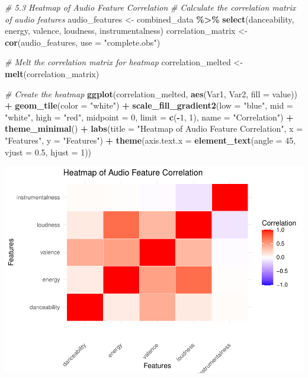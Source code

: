 \documentclass[
]{article}
\newenvironment{Shaded}{\begin{snugshade}}{\end{snugshade}}
\newcommand{\AttributeTok}[1]{\textcolor[rgb]{0.13,0.29,0.53}{#1}}
\newcommand{\CommentTok}[1]{\textcolor[rgb]{0.56,0.35,0.01}{\textit{#1}}}
\newcommand{\DecValTok}[1]{\textcolor[rgb]{0.00,0.00,0.81}{#1}}
\newcommand{\FloatTok}[1]{\textcolor[rgb]{0.00,0.00,0.81}{#1}}
\newcommand{\FunctionTok}[1]{\textcolor[rgb]{0.13,0.29,0.53}{\textbf{#1}}}
\newcommand{\NormalTok}[1]{#1}
\newcommand{\OtherTok}[1]{\textcolor[rgb]{0.56,0.35,0.01}{#1}}
\newcommand{\SpecialCharTok}[1]{\textcolor[rgb]{0.81,0.36,0.00}{\textbf{#1}}}
\newcommand{\StringTok}[1]{\textcolor[rgb]{0.31,0.60,0.02}{#1}}
\begin{document}
\begin{Shaded}
\begin{Highlighting}[]
\CommentTok{\# 5.3 Heatmap of Audio Feature Correlation}
\CommentTok{\# Calculate the correlation matrix of audio features}
\NormalTok{audio\_features }\OtherTok{\textless{}{-}}\NormalTok{ combined\_data }\SpecialCharTok{\%\textgreater{}\%} \FunctionTok{select}\NormalTok{(danceability, energy, valence, loudness, instrumentalness)}
\NormalTok{correlation\_matrix }\OtherTok{\textless{}{-}} \FunctionTok{cor}\NormalTok{(audio\_features, }\AttributeTok{use =} \StringTok{"complete.obs"}\NormalTok{)}

\CommentTok{\# Melt the correlation matrix for heatmap}
\NormalTok{correlation\_melted }\OtherTok{\textless{}{-}} \FunctionTok{melt}\NormalTok{(correlation\_matrix)}

\CommentTok{\# Create the heatmap}
\FunctionTok{ggplot}\NormalTok{(correlation\_melted, }\FunctionTok{aes}\NormalTok{(Var1, Var2, }\AttributeTok{fill =}\NormalTok{ value)) }\SpecialCharTok{+}
  \FunctionTok{geom\_tile}\NormalTok{(}\AttributeTok{color =} \StringTok{"white"}\NormalTok{) }\SpecialCharTok{+}
  \FunctionTok{scale\_fill\_gradient2}\NormalTok{(}\AttributeTok{low =} \StringTok{"blue"}\NormalTok{, }\AttributeTok{mid =} \StringTok{"white"}\NormalTok{, }\AttributeTok{high =} \StringTok{"red"}\NormalTok{, }\AttributeTok{midpoint =} \DecValTok{0}\NormalTok{, }\AttributeTok{limit =} \FunctionTok{c}\NormalTok{(}\SpecialCharTok{{-}}\DecValTok{1}\NormalTok{, }\DecValTok{1}\NormalTok{), }\AttributeTok{name =} \StringTok{"Correlation"}\NormalTok{) }\SpecialCharTok{+}
  \FunctionTok{theme\_minimal}\NormalTok{() }\SpecialCharTok{+}
  \FunctionTok{labs}\NormalTok{(}\AttributeTok{title =} \StringTok{"Heatmap of Audio Feature Correlation"}\NormalTok{, }\AttributeTok{x =} \StringTok{"Features"}\NormalTok{, }\AttributeTok{y =} \StringTok{"Features"}\NormalTok{) }\SpecialCharTok{+}
  \FunctionTok{theme}\NormalTok{(}\AttributeTok{axis.text.x =} \FunctionTok{element\_text}\NormalTok{(}\AttributeTok{angle =} \DecValTok{45}\NormalTok{, }\AttributeTok{vjust =} \FloatTok{0.5}\NormalTok{, }\AttributeTok{hjust =} \DecValTok{1}\NormalTok{))}
\end{Highlighting}
\end{Shaded}

\includegraphics{SpotifyProjectPDF_files/figure-latex/unnamed-chunk-10-1.pdf}
\end{document}
